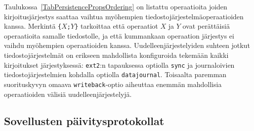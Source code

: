 Taulukossa~\ref{TabPersistencePropsOrdering} on listattu operaatioita joiden kirjoitusjärjestys saattaa vaihtua myöhempien tiedostojärjestelmäoperaatioiden kanssa.
Merkintä \texttt{\{}$X$\texttt{;}$Y$\texttt{\}} tarkoittaa että
operaatiot $X$ ja $Y$ ovat perättäisiä operaatioita samalle tiedostolle, ja että kummankaan operaation järjestys ei vaihdu myöhempien operaatioiden kanssa.
Uudelleenjärjestelyiden suhteen jotkut tiedostojärjestelmät on erikseen mahdollista konfiguroida tekemään kaikki kirjoitukset järjestyksessä:
\texttt{ext2}:n tapauksessa optiolla \texttt{sync} ja journaloivien tiedostojärjestelmien kohdalla optiolla \texttt{datajournal}.
Toisaalta paremman suorituskyvyn omaava \texttt{writeback}-optio aiheuttaa enemmän mahdollisia operaatioiden välisiä uudelleenjärjestelyjä.

%
%


\subsection{Sovellusten päivitysprotokollat}

